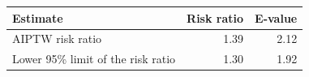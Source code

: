 {\small
\begin{tabular}{lrr}
\toprule
Estimate & Risk ratio & E-value \\
\midrule
AIPTW risk ratio & 1.39 & 2.12 \\
Lower 95\% limit of the risk ratio & 1.30 & 1.92 \\
\bottomrule
\end{tabular}
}
